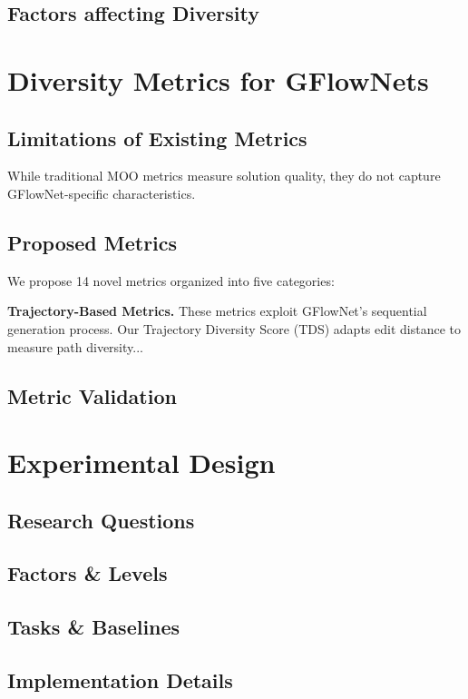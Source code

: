 \documentclass[10pts]{article}
\begin{document}
\subsection{Factors affecting Diversity}

\section{Diversity Metrics for GFlowNets}
\subsection{Limitations of Existing Metrics}
While traditional MOO metrics \citep{zitzler1999multiobjective, deb2002fast} 
measure solution quality, they do not capture GFlowNet-specific characteristics.

\subsection{Proposed Metrics} 
We propose 14 novel metrics organized into five categories:

\textbf{Trajectory-Based Metrics.} These metrics exploit GFlowNet's sequential 
generation process. Our Trajectory Diversity Score (TDS) adapts edit distance 
\citep{levenshtein1966binary} to measure path diversity...

\subsection{Metric Validation}

\section{Experimental Design}
\subsection{Research Questions}

\subsection{Factors \& Levels}

\subsection{Tasks \& Baselines}

\subsection{Implementation Details}
\end{document}
